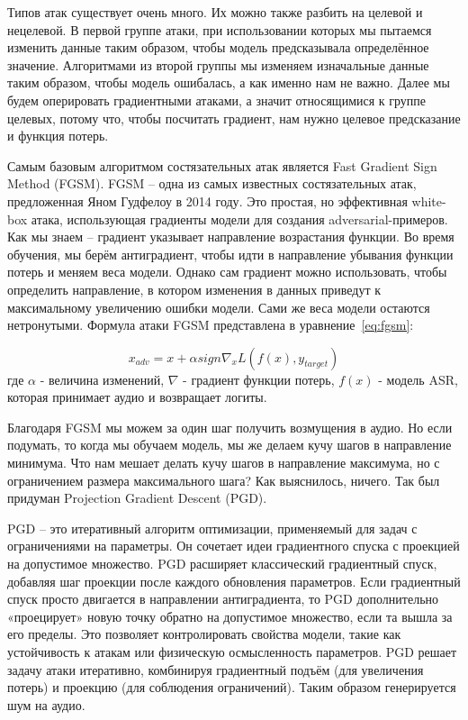 Типов атак существует очень много.
Их можно также разбить на целевой и нецелевой.
В первой группе атаки, при использовании которых мы пытаемся изменить данные таким образом, чтобы модель предсказывала определённое значение.
Алгоритмами из второй группы мы изменяем изначальные данные таким образом, чтобы модель ошибалась, а как именно нам не важно.
Далее мы будем оперировать градиентными атаками, а значит относящимися к группе целевых, потому что, чтобы посчитать градиент, нам нужно целевое предсказание и функция потерь.

Самым базовым алгоритмом состязательных атак является Fast Gradient Sign Method (FGSM).
FGSM -- одна из самых известных состязательных атак, предложенная Яном Гудфелоу в 2014 году\cite{goodfellow2014explaining}.
Это простая, но эффективная white-box атака, использующая градиенты модели для создания adversarial-примеров.
Как мы знаем -- градиент указывает направление возрастания функции.
Во время обучения, мы берём антиградиент, чтобы идти в направление убывания функции потерь и меняем веса модели.
Однако сам градиент можно использовать, чтобы определить направление, в котором изменения в данных приведут к максимальному увеличению ошибки модели.
Сами же веса модели остаются нетронутыми.
Формула атаки FGSM представлена в уравнение~\ref{eq:fgsm}:

\begin{equation}
  x_{adv} = x + \alpha sign \nabla_x L(f(x), y_{target})
  \label{eq:fgsm}
\end{equation}
где $\alpha$ - величина изменений, $\nabla$ - градиент функции потерь, $f(x)$ - модель ASR, которая принимает аудио и возвращает логиты.

Благодаря FGSM мы можем за один шаг получить возмущения в аудио.
Но если подумать, то когда мы обучаем модель, мы же делаем кучу шагов в направление минимума.
Что нам мешает делать кучу шагов в направление максимума, но с ограничением размера максимального шага?
Как выяснилось, ничего.
Так был придуман Projection Gradient Descent (PGD)\cite{madry2017towards}.

PGD -- это итеративный алгоритм оптимизации, применяемый для задач с ограничениями на параметры.
Он сочетает идеи градиентного спуска с проекцией на допустимое множество.
PGD расширяет классический градиентный спуск, добавляя шаг проекции после каждого обновления параметров.
Если градиентный спуск просто двигается в направлении антиградиента, то PGD дополнительно «проецирует» новую точку обратно на допустимое множество, если та вышла за его пределы.
Это позволяет контролировать свойства модели, такие как устойчивость к атакам или физическую осмысленность параметров.
PGD решает задачу атаки итеративно, комбинируя градиентный подъём (для увеличения потерь) и проекцию (для соблюдения ограничений).
Таким образом генерируется шум на аудио.


